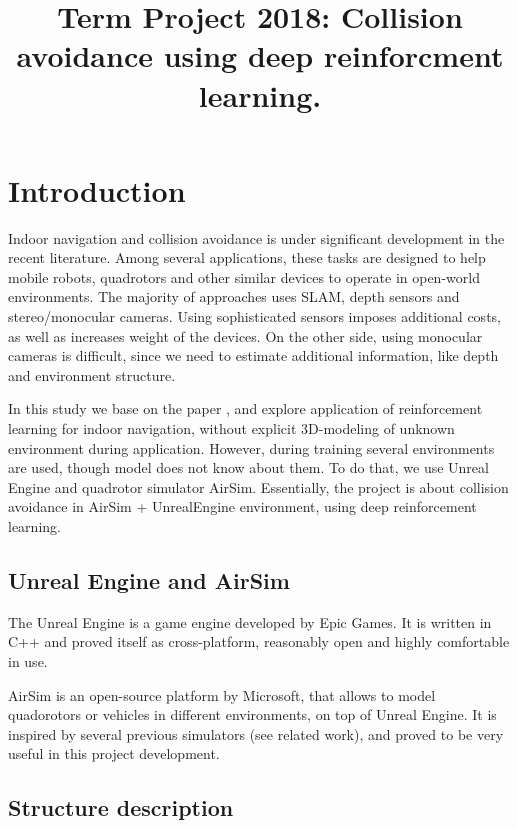 \documentclass{article}
\begin{document}
\title{
    Term Project 2018: Collision avoidance using deep reinforcment learning. 
}
\maketitle


\section{Introduction}

Indoor navigation and collision avoidance is under significant 
development in the recent literature. Among several applications,
these tasks are designed to help mobile robots, quadrotors and other
similar devices to operate in open-world environments. The majority
of approaches uses SLAM, depth sensors and stereo/monocular cameras.
Using sophisticated sensors imposes additional costs, as well as 
increases weight of the devices. On the other side, using monocular
cameras is difficult, since we need to estimate additional information,
like depth and environment structure.

In this study we base on the paper \cite{cad2rl},
and explore application of reinforcement learning for 
indoor navigation, without explicit 3D-modeling of unknown environment
during application. However, during training several environments are 
used, though model does not know about them. To do that, we use
Unreal Engine and quadrotor simulator AirSim.
Essentially, the project is about collision avoidance in AirSim +
UnrealEngine environment, using deep reinforcement learning.


\subsection{Unreal Engine and AirSim}

The Unreal Engine is a game engine developed by Epic Games.
It is written in C++ and proved itself as cross-platform, reasonably
open and highly comfortable in use.

AirSim  is  an  open-source  platform \cite{airsim2017fsr} by Microsoft,
that allows to model quadorotors or vehicles in different environments, 
on top of Unreal Engine.
It is inspired by several previous simulators (see
related work), and proved to be very useful in this project development.

\subsection{Structure description}
\end{document}

